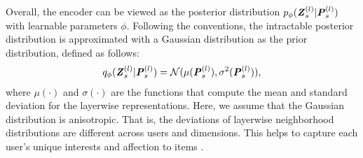 \documentclass[letterpaper]{article} %
\begin{document}
Overall, the encoder can be viewed as the posterior distribution $p_{\phi}(\textbf{\textit{Z}}_s^{(l)}|\textbf{\textit{P}}_s^{(l)})$ with learnable parameters $\phi$. Following the conventions, the intractable posterior distribution is approximated with a Gaussian distribution as the prior distribution, defined as follows:
\begin{align}
    q_{\phi}(\textbf{\textit{Z}}_s^{(l)}|\textbf{\textit{P}}_s^{(l)}) = \mathcal{N}(\mu(\textbf{\textit{P}}_s^{(l)}), \sigma^2(\textbf{\textit{P}}_s^{(l)})),
\end{align}
where $\mu(\cdot)$ and $\sigma(\cdot)$ are the functions that compute the mean and standard deviation for the layerwise representations. Here, we assume that the Gaussian distribution is anisotropic. That is, the deviations of layerwise neighborhood distributions are different across users and dimensions. This helps to capture each user's unique interests and affection to items \cite{ESRF}. 
\end{document}
